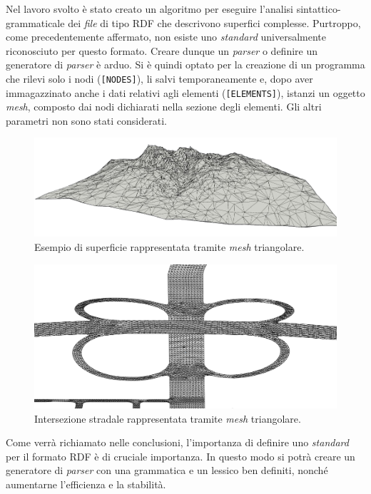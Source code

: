 Nel lavoro svolto è stato creato un algoritmo per eseguire l'analisi sintattico-grammaticale dei \textit{file} di tipo \ac{RDF} che descrivono superfici complesse. Purtroppo, come precedentemente affermato, non esiste uno \textit{standard} universalmente riconosciuto per questo formato. Creare dunque un \textit{parser} o definire un generatore di \textit{parser} è arduo. Si è quindi optato per la creazione di un programma che rilevi solo i nodi (\texttt{[NODES]}), li salvi temporaneamente e, dopo aver immagazzinato anche i dati relativi agli elementi (\texttt{[ELEMENTS]}), istanzi un oggetto \textit{mesh}, composto dai nodi dichiarati nella sezione degli elementi. Gli altri parametri non sono stati considerati.

\begin{figure}
	\centering
	\includegraphics[width=0.7\linewidth]{Figures/mesh}
	\caption{Esempio di superficie rappresentata tramite \textit{mesh} triangolare.}
\end{figure}
\begin{figure}
	\centering
	\includegraphics[width=0.7\linewidth]{Figures/mesh_1}
	\caption{Intersezione stradale rappresentata tramite \textit{mesh} triangolare.}
\end{figure}

Come verrà richiamato nelle conclusioni, l'importanza di definire uno \textit{standard} per il formato \ac{RDF} è di cruciale importanza. In questo modo si potrà creare un generatore di \textit{parser} con una grammatica e un lessico ben definiti, nonché aumentarne l'efficienza e la stabilità.